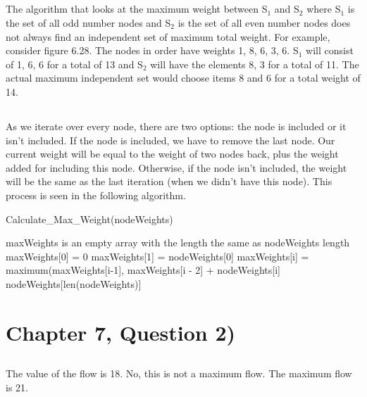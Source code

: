 \documentclass[11pt]{article}
\begin{document}
\subsection{}
The algorithm that looks at the maximum weight between S$_1$ and S$_2$ where S$_1$ is the set of all odd number nodes and S$_2$ is the set of all even number nodes does not always find an independent set of maximum total weight. For example, consider figure 6.28. The nodes in order have weights 1, 8, 6, 3, 6. S$_1$ will consist of 1, 6, 6 for a total of 13 and S$_2$ will have the elements 8, 3 for a total of 11. The actual maximum independent set would choose items 8 and 6 for a total weight of 14.

\subsection{}
As we iterate over every node, there are two options: the node is included or it isn't included. If the node is included, we have to remove the last node. Our current weight will be equal to the weight of two nodes back, plus the weight added for including this node. Otherwise, if the node isn't included, the weight will be the same as the last iteration (when we didn't have this node). This process is seen in the following algorithm.

\begin{algorithm}[H]
\caption{Calculate\_Max\_Weight(nodeWeights)}
\begin{algorithmic} 
\STATE maxWeights is an empty array with the length the same as nodeWeights length
\STATE maxWeights[0] = 0
\STATE maxWeights[1] = nodeWeights[0]
\STATE maxWeights[i] = maximum(maxWeights[i-1], maxWeights[i - 2] + nodeWeights[i]
\ENDFOR
\RETURN nodeWeights[len(nodeWeights)]
\end{algorithmic}
\end{algorithm}


\section{Chapter 7, Question 2)}
\subsection{}
The value of the flow is 18. No, this is not a maximum flow. The maximum flow is 21.
\end{document}
